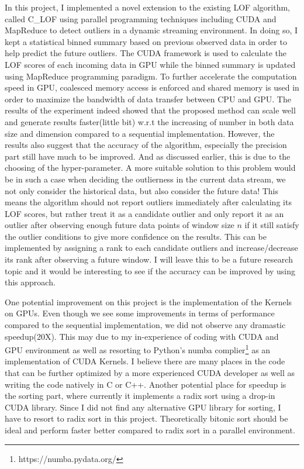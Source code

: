 \documentclass[11pt]{article}       %
\begin{document}
In this project, I implemented a novel extension to the existing LOF algorithm, called C\_LOF using parallel programming techniques including CUDA and MapReduce to detect outliers in a dynamic streaming environment. In doing so, I kept a statistical binned summary based on previous observed data in order to help predict the future outliers. The CUDA framework is used to calculate the LOF scores of each incoming data in GPU while the binned summary is updated using MapReduce programming paradigm. To further accelerate the computation speed in GPU, coalesced memory access is enforced and shared memory is used in order to maximize the bandwidth of data transfer between CPU and GPU. The results of the experiment indeed showed that the proposed method can scale well and generate results faster(little bit) w.r.t the increasing of number in both data size and dimension compared to a sequential implementation. However, the results also suggest that the accuracy of the algorithm, especially the precision part still have much to be improved. And as discussed earlier, this is due to the choosing of the hyper-parameter. A more suitable solution to this problem would be in such a case when deciding the outlierness in the current data stream, we not only consider the historical data, but also consider the future data! This means the algorithm should not report outliers immediately after calculating its LOF scores, but rather treat it as a candidate outlier and only report it as an outlier after observing enough future data points of window size $n$ if it still satisfy the outlier conditions to give more confidence on the results. This can be implemented by assigning a rank to each candidate outliers and increase/decrease its rank after observing a future window. I will leave this to be a future research topic and it would be interesting to see if the accuracy can be improved by using this approach. 

One potential improvement on this project is the implementation of the Kernels on GPUs. Even though we see some improvements in terms of performance compared to the sequential implementation, we did not observe any dramastic speedup(20X). This may due to my in-experience of coding with CUDA and GPU environment as well as resorting to Python's numba complier\footnote{https://numba.pydata.org/} as an implementation of CUDA Kernels. I believe there are many places in the code that can be further optimized by a more experienced CUDA developer as well as writing the code natively in C or C++. Another potential place for speedup is the sorting part, where currently it implements a radix sort using a drop-in CUDA library. Since I did not find any alternative GPU library for sorting, I have to resort to radix sort in this project. Theoretically bitonic sort should be ideal and perform faster better compared to radix sort in a parallel environment\cite{6718294}. 



\end{document}
